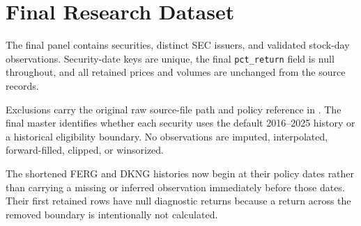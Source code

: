 \section{Final Research Dataset}

The final panel contains \FinalSecurities{} securities,
\FinalIssuers{} distinct SEC issuers, and \FinalObservations{} validated
stock-day observations. Security-date keys are unique, the final
\texttt{pct\_return} field is null throughout, and all retained prices and
volumes are unchanged from the source records.

Exclusions carry the original raw source-file path and policy reference in
. The final master identifies whether each
security uses the default 2016--2025 history or a historical eligibility
boundary. No observations are imputed, interpolated, forward-filled, clipped,
or winsorized.

\begin{table}[tbp]
\centering
\caption{Final observations by calendar year}
\label{tab:final-years}
\small
{}
\end{table}

The shortened FERG and DKNG histories now begin at their policy dates rather
than carrying a missing or inferred observation immediately before those dates.
Their first retained rows have null diagnostic returns because a return across
the removed boundary is intentionally not calculated.
